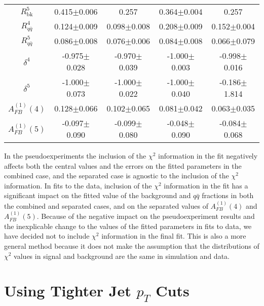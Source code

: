 \documentclass{cmspaperpdf}
\begin{document}
\begin{table}[hbt]
\begin{center}
\begin{tabular}{|c|cc|cc|}
$R^5_\mathrm{bk}$ & 0.415$\pm$0.006   & 0.257                                   & 0.364$\pm$0.004   & 0.257            \\ 
$R^4_{q\bar q}$   & 0.124$\pm$0.009   & 0.098$\pm$0.008                         & 0.208$\pm$0.009   & 0.152$\pm$0.004  \\ 
$R^5_{q\bar q}$   & 0.086$\pm$0.008   & 0.076$\pm$0.006                         & 0.084$\pm$0.008   & 0.066$\pm$0.079  \\ 
$\delta^4$        & -0.975$\pm$0.028  & -0.970$\pm$0.039                        & -1.000$\pm$0.003  & -0.998$\pm$0.016 \\ 
$\delta^5$        & -1.000$\pm$0.073  & -1.000$\pm$0.022                        & -1.000$\pm$0.040  & -0.186$\pm$1.814 \\ 
$A^{(1)}_{FB}(4)$ & 0.128$\pm$0.066   & 0.102$\pm$0.065                         & 0.081$\pm$0.042   & 0.063$\pm$0.035  \\
$A^{(1)}_{FB}(5)$ & -0.097$\pm$0.090  & -0.099$\pm$0.080                        & -0.048$\pm$0.090  & -0.084$\pm$0.068 \\
\hline
\end{tabular}
\end{center}
\end{table}

In the pseudoexperiments the inclusion of the $\chi^{2}$ information in the fit negatively affects both the central values and the errors on the fitted parameters in the combined case, and the separated case is agnostic to the inclusion of the $\chi^{2}$ information. In fits to the data, inclusion of the $\chi^{2}$ information in the fit has a significant impact on the fitted value of the background and $q\bar{q}$ fractions in both the combined and separated cases, and on the separated values of $A^{(1)}_{FB}(4)$ and $A^{(1)}_{FB}(5)$. Because of the negative impact on the pseudoexperiment results and the inexplicable change to the values of the fitted parameters in fits to data, we have decided not to include $\chi^{2}$ information in the final fit. This is also a more general method because it does not make the assumption that the distributions of $\chi^{2}$ values in signal and background are the same in simulation and data.

\section{Using Tighter Jet $p_{T}$ Cuts}
\end{document}
